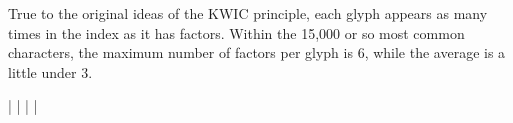 \endgroup{}

\vspace{\myLineheight}\begin{multicols}{2}\raggedcolumns{}

\end{multicols}

\null\newpage{}

\vspace{\myLineheight}\begin{multicols}{2}\raggedcolumns{}
True to the original ideas of the KWIC principle, each glyph appears
as many times in the index as it has factors. Within the 15,000 or so most
common characters, the maximum number of factors per glyph is 6, while the
average is a little under 3.

\end{multicols}



\begingroup\mktsObeyAllLines{}

\begingroup\mktsStyleCode{}\cjkgGlue{\cjk{}\cjkgGlue{\cnsym{}　}\cjkgGlue{}\cjkgGlue{\cnsym{}　}\cjkgGlue{}\cjkgGlue{\cnsym{}　}\cjkgGlue{}\cjkgGlue{\cnsym{}　}\cjkgGlue{}\cjkgGlue{\cnsym{}　}\cjkgGlue{}\cjkgGlue{\cnsym{}　}\cjkgGlue{}}\cjkgGlue{}|\cjkgGlue{} 
\cjkgGlue{}|\cjkgGlue{} 
\cjkgGlue{}|\cjkgGlue{} 
\cjkgGlue{}|\cjkgGlue{} 
\endgroup{}{}


